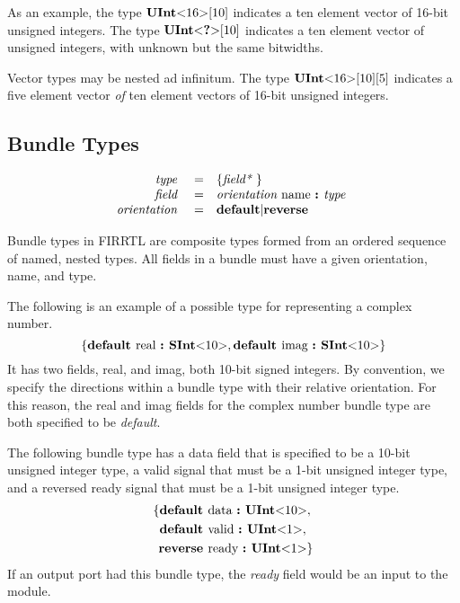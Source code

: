 \documentclass[12pt]{article}
\begin{document}
As an example, the type $\text{\bf UInt}\text{\bf $<$} 16 \text{\bf $>$}[10]$ indicates a ten element vector of 16-bit unsigned integers.
The type $\text{\bf UInt}\text{\bf $<$} \text{\bf ?} \text{\bf $>$}[10]$ indicates a ten element vector of unsigned integers, with unknown but the same bitwidths.

Vector types may be nested ad infinitum.
The type $\text{\bf UInt}\text{\bf $<$} 16 \text{\bf $>$}[10][5]$ indicates a five element vector {\em of} ten element vectors of 16-bit unsigned integers.

\subsection{Bundle Types}
\[
\begin{array}{rrl}
\text{\em type\ }       &=     &\{\text{\em field*\ }\}                         \\
\text{\em field\ }      &=     &\text{\em orientation\ } \text{name } \text{\bf :\ } \text{\em type\ }        \\
\text{\em orientation\ }&=     &\text{\bf default} \vert \text{\bf reverse}    \\ 
\end{array}
\]

Bundle types in FIRRTL are composite types formed from an ordered sequence of named, nested types.
All fields in a bundle must have a given orientation, name, and type.

The following is an example of a possible type for representing a complex number.
\[
\{\text{\bf default\ } \text{real } \text{\bf :\ } \text{\bf SInt}\text{\bf $<$} 10 \text{\bf $>$},
         \text{\bf default\ } \text{imag } \text{\bf :\ } \text{\bf SInt}\text{\bf $<$} 10 \text{\bf $>$}\}
\]
It has two fields, real, and imag, both 10-bit signed integers.
By convention, we specify the directions within a bundle type with their relative orientation.
For this reason, the real and imag fields for the complex number bundle type are both specified to be {\em default}.

The following bundle type has a data field that is specified to be a 10-bit unsigned integer type, a valid signal that must be a 1-bit unsigned integer type, and a reversed ready signal that must be a 1-bit unsigned integer type.
\[
\begin{aligned}
\{ \text{\bf default\ } &\text{data } \text{\bf :\ } \text{\bf UInt}\text{\bf $<$} 10 \text{\bf $>$}, \\
   \text{\bf default\ } &\text{valid } \text{\bf :\ } \text{\bf UInt}\text{\bf $<$} 1 \text{\bf $>$}, \\
   \text{\bf reverse\ } &\text{ready } \text{\bf :\ } \text{\bf UInt}\text{\bf $<$} 1 \text{\bf $>$}\} \\
\end{aligned}
\]
If an output port had this bundle type, the {\em ready} field would be an input to the module.
\end{document}
